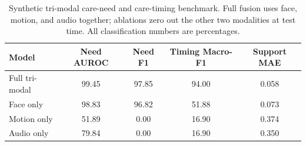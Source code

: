 \begin{table}[t]
\centering
\caption{Synthetic tri-modal care-need and care-timing benchmark. Full fusion uses face, motion, and audio together; ablations zero out the other two modalities at test time. All classification numbers are percentages.}
\label{tab:trimodal-care-results}
\small
\begin{tabular}{lcccc}
\toprule
Model & Need AUROC & Need F1 & Timing Macro-F1 & Support MAE \\
\midrule
Full tri-modal & 99.45 & 97.85 & 94.00 & 0.058 \\
Face only & 98.83 & 96.82 & 51.88 & 0.073 \\
Motion only & 51.89 & 0.00 & 16.90 & 0.374 \\
Audio only & 79.84 & 0.00 & 16.90 & 0.350 \\
\bottomrule
\end{tabular}
\end{table}
